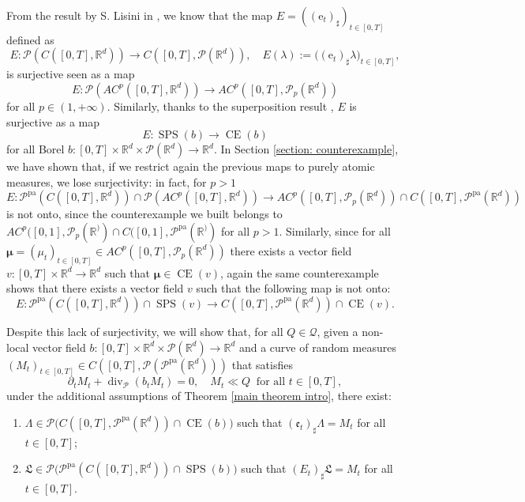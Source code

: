 \documentclass[10pt,leqno]{amsart}
\numberwithin{equation}{section}
\newcommand{\R}{\mathbb{R}}
\newcommand{\Q}{\mathbb{Q}}
\newcommand{\PP}{\mathcal{P}}
\newcommand{\PPpa}{\PP^{\operatorname{pa}}}
\newcommand{\e}{\mathrm{e}}
\renewcommand{\Q}{Q}
\begin{document}
From the result by S. Lisini in \cite{lisini2007characterization}, we know that the map $E = ((\e_t)_\sharp)_{t\in[0,T]}$ defined as
\[E:\PP(C([0,T],\R^d)) \to C([0,T],\PP(\R^d)), \quad E(\lambda) := \big( (\e_t)_\sharp \lambda \big)_{t\in[0,T]},\]
is surjective seen as a map 
\begin{equation}\label{eq:5}
    E:\PP(AC^p([0,T],\R^d)) \to AC^p([0,T],\PP_p(\R^d))
\end{equation}
for all $p\in(1,+\infty)$. Similarly, thanks to the superposition result \cite[Theorem 8.2.1]{ambrosio2005gradient}, $E$ is surjective as a map 
\begin{equation}\label{eq:6}
    E:\operatorname{SPS}(b) \to \operatorname{CE}(b)
\end{equation}
for all Borel $b:[0,T]\times \R^d \times \PP(\R^d) \to \R^d$.
In Section \ref{section: counterexample}, we have shown that, if we restrict again the previous maps to purely atomic measures, we lose surjectivity: in fact, for $p>1$
\begin{equation}\label{eq:7}
    E:\PPpa(C([0,T],\R^d))\cap \PP(AC^p([0,T],\R^d)) \to AC^p([0,T],\PP_p(\R^d)) \cap C([0,T],\PPpa(\R^d))
\end{equation}
is not onto, since the counterexample we built belongs to $AC^p([0,1],\PP_p(\R^)) \cap C([0,1],\PPpa(\R^))$ for all $p>1$. Similarly, since for all $\boldsymbol{\mu}=(\mu_t)_{t\in[0,T]} \in AC^p([0,T],\PP_p(\R^d))$ there exists a vector field $v:[0,T]\times \R^d \to \R^d$ such that $\boldsymbol{\mu} \in \operatorname{CE}(v)$, again the same counterexample shows that there exists a vector field $v$ such that the following map is not onto:
\begin{equation}\label{eq:8}
    E:\PPpa(C([0,T],\R^d))\cap \operatorname{SPS}(v) \to C([0,T],\PPpa(\R^d)) \cap \operatorname{CE}(v).
\end{equation}


Despite this lack of surjectivity, we will show that, for all $\Q\in \mathcal{Q}$, given a non-local vector field $b:[0,T]\times \R^d \times \PP(\R^d) \to \R^d$ and a curve of random measures $(M_t)_{t\in[0,T]} \in C([0,T],\PP(\PPpa(\R^d)))$ that satisfies
\begin{equation}\label{eq:9}
    \partial_tM_t + \operatorname{div}_\PP(b_tM_t) =0, \quad M_t \ll \Q \ \text{ for all }t\in [0,T],
\end{equation}
under the additional assumptions of Theorem \ref{main theorem intro}, there exist:
\begin{enumerate}
    \item $\Lambda \in \PP\big(C([0,T],\PPpa(\R^d))\cap \operatorname{CE}(b)\big)$ such that $(\mathfrak{e}_t)_\sharp \Lambda = M_t$ for all $t\in[0,T]$;
    \item $\mathfrak{L}\in \PP\big( \PPpa(C([0,T],\R^d)) \cap \operatorname{SPS}(b) \big)$ such that $(E_t)_\sharp\mathfrak{L} = M_t$ for all $t\in [0,T]$.
\end{enumerate}
\end{document}
